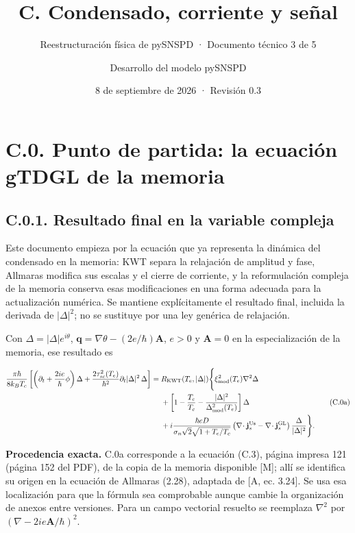 \documentclass[
  spanish,
  10pt,
  a4paper,
]{article}
\title{C. Condensado, corriente y señal}
\subtitle{Reestructuración física de pySNSPD · Documento técnico 3 de 5}
\author{Desarrollo del modelo pySNSPD}
\date{8 de septiembre de 2026 · Revisión 0.3}
\begin{document}
\maketitle

{
\setcounter{tocdepth}{1}
\tableofcontents
}
\newpage

\section{C.0. Punto de partida: la ecuación gTDGL de la
memoria}\label{c.0.-punto-de-partida-la-ecuaciuxf3n-gtdgl-de-la-memoria}

\subsection{C.0.1. Resultado final en la variable
compleja}\label{c.0.1.-resultado-final-en-la-variable-compleja}

Este documento empieza por la ecuación que ya representa la dinámica del
condensado en la memoria: KWT separa la relajación de amplitud y fase,
Allmaras modifica sus escalas y el cierre de corriente, y la
reformulación compleja de la memoria conserva esas modificaciones en una
forma adecuada para la actualización numérica. Se mantiene
explícitamente el resultado final, incluida la derivada de
\(|\Delta|^2\); no se sustituye por una ley genérica de relajación.

Con \(\Delta=|\Delta|e^{i\theta}\),
\(\mathbf q=\nabla\theta-(2e/\hbar)\mathbf A\), \(e>0\) y
\(\mathbf A=0\) en la especialización de la memoria, ese resultado es

\[
\begin{aligned}
\frac{\pi\hbar}{8k_BT_c}
\left[
\left(\partial_t+\frac{2ie}{\hbar}\phi\right)\Delta
+\frac{2\tau_{sc}^2(T_e)}{\hbar^2}
\partial_t|\Delta|^2\,\Delta
\right]
={}&R_{\rm KWT}(T_e,|\Delta|)
\Bigg\{
\xi_{\rm mod}^2(T_e)\nabla^2\Delta\\
&+\left[1-\frac{T_e}{T_c}
-\frac{|\Delta|^2}{\Delta_{\rm mod}^2(T_e)}\right]\Delta\\
&+i\frac{\hbar eD}{\sigma_n\sqrt2\sqrt{1+T_e/T_c}}
\left(\nabla\!\cdot\mathbf j_s^{\rm Us}
-\nabla\!\cdot\mathbf j_s^{\rm GL}\right)
\frac{\Delta}{|\Delta|^2}
\Bigg\}.
\end{aligned}
\tag{C.0a}
\]

\textbf{Procedencia exacta.} C.0a corresponde a la ecuación (C.3),
página impresa 121 (página 152 del PDF), de la copia de la memoria
disponible {[}M{]}; allí se identifica su origen en la ecuación de
Allmaras (2.28), adaptada de {[}A, ec. 3.24{]}. Se usa esa localización
para que la fórmula sea comprobable aunque cambie la organización de
anexos entre versiones. Para un campo vectorial resuelto se reemplaza
\(\nabla^2\) por \((\nabla-2ie\mathbf A/\hbar)^2\).
\end{document}
